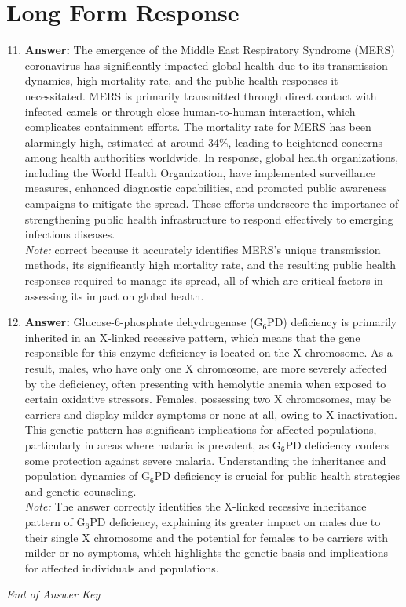 \documentclass[12pt]{article}
\begin{document}
\section*{Long Form Response}
\begin{enumerate}[label=\arabic*.]
\setcounter{enumi}{10}
\item \textbf{Answer:} The emergence of the Middle East Respiratory Syndrome (MERS) coronavirus has significantly impacted global health due to its transmission dynamics, high mortality rate, and the public health responses it necessitated. MERS is primarily transmitted through direct contact with infected camels or through close human-to-human interaction, which complicates containment efforts. The mortality rate for MERS has been alarmingly high, estimated at around 34\%, leading to heightened concerns among health authorities worldwide. In response, global health organizations, including the World Health Organization, have implemented surveillance measures, enhanced diagnostic capabilities, and promoted public awareness campaigns to mitigate the spread. These efforts underscore the importance of strengthening public health infrastructure to respond effectively to emerging infectious diseases.
\\ \textit{Note:} correct because it accurately identifies MERS's unique transmission methods, its significantly high mortality rate, and the resulting public health responses required to manage its spread, all of which are critical factors in assessing its impact on global health.
\item \textbf{Answer:} Glucose-6-phosphate dehydrogenase (G$_{6}$PD) deficiency is primarily inherited in an X-linked recessive pattern, which means that the gene responsible for this enzyme deficiency is located on the X chromosome. As a result, males, who have only one X chromosome, are more severely affected by the deficiency, often presenting with hemolytic anemia when exposed to certain oxidative stressors. Females, possessing two X chromosomes, may be carriers and display milder symptoms or none at all, owing to X-inactivation. This genetic pattern has significant implications for affected populations, particularly in areas where malaria is prevalent, as G$_{6}$PD deficiency confers some protection against severe malaria. Understanding the inheritance and population dynamics of G$_{6}$PD deficiency is crucial for public health strategies and genetic counseling.
\\ \textit{Note:} The answer correctly identifies the X-linked recessive inheritance pattern of G$_{6}$PD deficiency, explaining its greater impact on males due to their single X chromosome and the potential for females to be carriers with milder or no symptoms, which highlights the genetic basis and implications for affected individuals and populations.
\end{enumerate}

\vfill
\noindent\textit{End of Answer Key}
\end{document}
